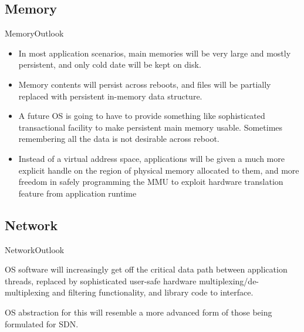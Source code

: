 \documentclass[10pt]{beamer}
\begin{document}
\subsection{Memory}
\begin{frame}{Memory}{Outlook}
  \begin{itemize}
    \item In most application scenarios, main memories will be very large and
          mostly persistent, and only cold date will be kept on disk. \pause
    \item Memory contents will persist across reboots, and files will be
          partially replaced with persistent in-memory data structure. \pause
    \item A future OS is going to have to provide something like sophisticated
          transactional facility to make persistent main memory usable.
          Sometimes remembering all the data is not desirable across reboot. \pause
    \item Instead of a virtual address space, applications will be given a much
          more explicit handle on the region of physical memory allocated to
          them, and more freedom in safely programming the MMU to exploit
          hardware translation feature from application runtime
  \end{itemize}
\end{frame}

\subsection{Network}
\begin{frame}{Network}{Outlook}
  \begin{block}{}
    OS software will increasingly get off the critical data path between
    application threads, replaced by sophisticated user-safe hardware
    multiplexing/de-multiplexing and filtering functionality, and library
    code to interface.
  \end{block}

  \begin{block}
    OS abstraction for this will resemble a more advanced form of those being
    formulated for SDN.
  \end{block}

\end{frame}
\end{document}
